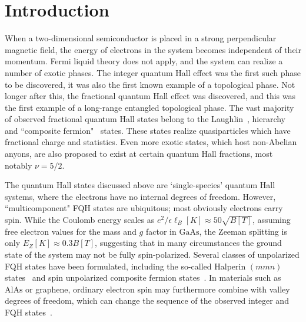 \section{Introduction}

When a two-dimensional semiconductor is placed in a strong perpendicular magnetic field, the energy of electrons in the system becomes independent of their momentum. Fermi liquid theory does not apply, and the system can realize a number of exotic phases. The integer quantum Hall effect was the first such phase to be discovered, it was also the first known example of a topological phase\cite{klitzing}. Not longer after this, the fractional quantum Hall effect was discovered\cite{Tsui-PhysRevLett.48.1559}, and this was the first example of a long-range entangled topological phase. The vast majority of observed fractional quantum Hall states belong to the Laughlin~\cite{Laughlin-PhysRevLett.50.1395}, hierarchy~\cite{Haldane1983, Halperin84} and ``composite fermion"~\cite{Jain:1989p294} states. These states realize quasiparticles which have fractional charge and statistics\cite{Laughlin-PhysRevLett.50.1395,LeinaasMyrheim, Arovas-Schrieffer-Wilczek}. 
Even more exotic states, which host non-Abelian anyons, are also proposed to exist at certain quantum Hall fractions, most notably $\nu=5/2$\cite{MooreRead, Greiter91, Greiter92}. 

The quantum Hall states discussed above are `single-species' quantum Hall systems, where the electrons have no internal degrees of freedom. 
However, ``multicomponent" FQH states are ubiquitous; most obviously electrons carry spin.
While the Coulomb energy scales as $e^2/\epsilon\ell_B [\unit{K}] \approx 50 \sqrt{B[\unit{T}]}$, assuming free electron values for the mass and $g$ factor in $\mathrm{GaAs}$, the Zeeman splitting is only $E_Z [\unit{K}] \approx 0.3 B[\unit{T}]$, suggesting that in many circumstances the ground state of the system may not be fully spin-polarized. 
Several classes of unpolarized FQH states have been formulated, including the so-called Halperin $(mmn)$ states~\cite{Halperin83} and spin unpolarized composite fermion states~\cite{Wu93, Wu94, Davenport12, Balram14}.
In materials such as $\mathrm{AlAs}$ or graphene, ordinary electron spin may furthermore combine with valley degrees of freedom, which can change the sequence of the observed integer and FQH states~\cite{Bishop07, Padmanabhan09, Gokmen10, Novoselov05, Zhang05, Du09, Bolotin09, Ghahari11, Dean11, Feldman12}. 

